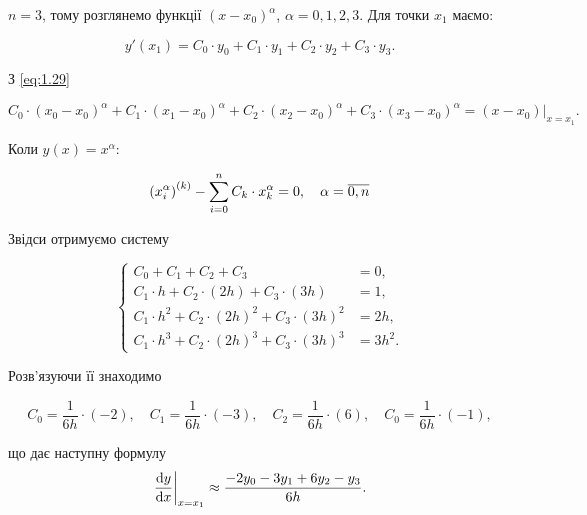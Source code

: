\begin{solution}
$n = 3$, тому розглянемо функції $(x - x_0)^\alpha$, $\alpha = 0, 1, 2, 3$. Для точки $x_1$ маємо:

\begin{equation*}
	y'(x_1) = C_0 \cdot y_0 + C_1 \cdot y_1 + C_2 \cdot y_2 + C_3 \cdot y_3.
\end{equation*}

З \eqref{eq:1.29}

\begin{equation}
	\label{eq:1.30}
	C_0 \cdot (x_0 - x_0)^\alpha + C_1 \cdot (x_1 - x_0)^\alpha + C_2 \cdot (x_2 - x_0)^\alpha + C_3 \cdot (x_3 - x_0)^\alpha = \left. (x - x_0) \right|_{x = x_1}.
\end{equation}

\begin{remark*}
	Коли $y(x) = x^\alpha$:

	\begin{equation}
		\label{eq:1.29_prime}
		\left( x_i^\alpha \right)^{(k)}  - \displaystyle\sum\limits_{i = 0}^n C_k \cdot x_k^\alpha = 0, \quad \alpha = \overline{0,n}
	\end{equation}
\end{remark*}

Звідси отримуємо систему

\begin{equation*}
	\left\{
		\begin{aligned}
			C_0 + C_1 + C_2 + C_3 &= 0, \\
			C_1 \cdot h + C_2 \cdot (2h) + C_3 \cdot (3h) &= 1, \\
			C_1 \cdot h^2 + C_2 \cdot (2h)^2 + C_3 \cdot (3h)^2 &= 2h, \\
			C_1 \cdot h^3 + C_2 \cdot (2h)^3 + C_3 \cdot (3h)^3 &= 3h^2.
		\end{aligned}
	\right.
\end{equation*}

Розв'язуючи її знаходимо

\begin{equation*}
	C_0 = \frac{1}{6h} \cdot (-2), \quad C_1 = \frac{1}{6h} \cdot (-3), \quad C_2 = \frac{1}{6h} \cdot (6), \quad C_0 = \frac{1}{6h} \cdot (-1), 
\end{equation*}

що дає наступну формулу
\begin{equation*}
	\left. \frac{\mathop{}\!\mathrm{d} y}{\mathop{}\!\mathrm{d} x} \right|_{x = x_1} \approx \frac{-2y_0-3y_1+6y_2-y_3}{6h}.
\end{equation*}
\end{solution}

